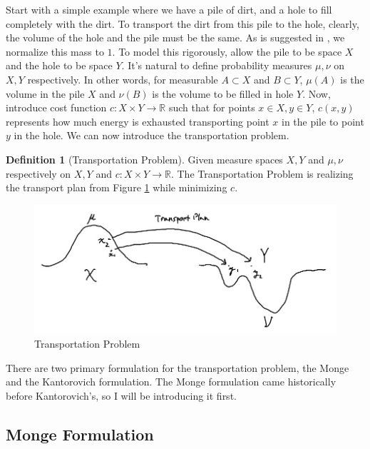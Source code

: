 \documentclass[psamsfonts]{amsart}
\newcommand{\comp}[2]{
\vspace{0.2in}\begin{mdframed}[
  backgroundcolor=problem,
  userdefinedwidth=10cm,
  align=center,
  skipabove=\topsep,
  skipbelow=\topsep
  ]
  \emph{{#1}:\newline} {#2}
\end{mdframed}}
\theoremstyle{definition}
\newtheorem{defn}{Definition}[section]
\numberwithin{equation}{section}
\begin{document}
Start with a simple example where we have a pile of dirt, and a hole to fill completely with the dirt.
To transport the dirt from this pile to the hole, clearly, the volume of the hole and the pile must be the same. As is suggested in \cite{villani}, we normalize this mass to $1$.\newline
To model this rigorously, allow the pile to be space $X$ and the hole to be space $Y$. It's natural to define probability measures $\mu,\nu$ on $X,Y$ respectively.
In other words, for measurable $A\subset X$ and $B\subset Y$, $\mu(A)$ is the volume in the pile $X$ and $\nu(B)$ is the volume to be filled in hole $Y$.\newline
Now, introduce cost function $c: X\times Y \to \mathbb{R}$ such that for points $x\in X,y\in Y$, $c(x,y)$ represents how much energy is exhausted transporting point $x$ in the pile to point $y$ in the hole.\newline
We can now introduce the transportation problem.
\begin{defn}[Transportation Problem]\label{defn:tp}
Given measure spaces $X,Y$ and $\mu,\nu$ respectively on $X,Y$ and $c: X\times Y\to \mathbb{R}$. The Transportation Problem is realizing the transport plan from Figure \ref{fig:tran} while minimizing $c$.
\end{defn}
\begin{figure}[H]
  \includegraphics[scale=0.3]{transport.jpg}
  \caption{Transportation Problem}
  \label{fig:tran}
\end{figure}

There are two primary formulation for the transportation problem, the Monge and the Kantorovich formulation. The Monge formulation came historically before Kantorovich's, so I will be introducing it first.
\subsection{Monge Formulation}\hfill\\
\end{document}
